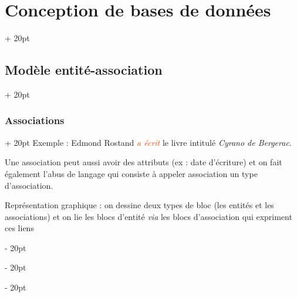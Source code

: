 \documentclass[a4paper, 12pt, twoside]{article}
\renewcommand{\emph}{\textcolor{ff4500}}
\newcommand{\ind}[1][20pt]{\advance\leftskip + #1}
\newcommand{\deind}[1][20pt]{\advance\leftskip - #1}
\newenvironment{indt}[2][20pt]{#2 \par \ind[#1]}{\par \deind} %
\begin{document}
\begin{indt}{\section{Conception de bases de données}}
\begin{indt}{\subsection{Modèle entité-association}}
\begin{indt}{\subsubsection{Associations}}
                Exemple : Edmond Rostand \emph{\it a écrit} le livre intitulé \textit{Cyrano de Bergerac}.

                Une association peut aussi avoir des attributs (ex : date d'écriture) et on fait également l'abus de langage qui consiste à appeler association un type d'association.

                \vspace{12pt}
                
                Représentation graphique : on dessine deux types de bloc (les entités et les associations) et on lie les blocs d'entité \textit{via} les blocs d'association qui expriment ces liens
                \begin{center}
\end{center}
\end{indt}
\end{indt}
\end{indt}
\end{document}
